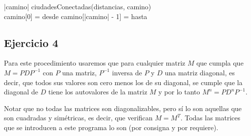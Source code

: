 \documentclass[10pt,a4paper]{article}
\begin{document}
{}

{}

{}

{}

{|camino|  \land ciudadesConectadas(distancias, camino) \land \\
camino[0] = desde \land
camino[|camino| - 1] = hasta} 

{}

\subsection{Ejercicio 4}

Para este procedimiento usaremos que para cualquier matriz $M$ que cumpla que $M = PDP^{-1}$ con $P$ una matriz,
$P^{-1}$ inversa de $P$ y $D$ una matriz diagonal, es decir, que todos sus valores son cero menos los de su diagonal, se cumple que la diagonal
de $D$ tiene los autovalores de la matriz $M$ y por lo tanto $M^{n} = PD^{n}P^{-1}$.

Notar que no todas las matrices son diagonalizables, pero sí lo son aquellas que son cuadradas y simétricas,
es decir, que verifican $M = M^{T}$. Todas las matrices que se introducen a este programa lo son (por consigna y por requiere).
\end{document}
